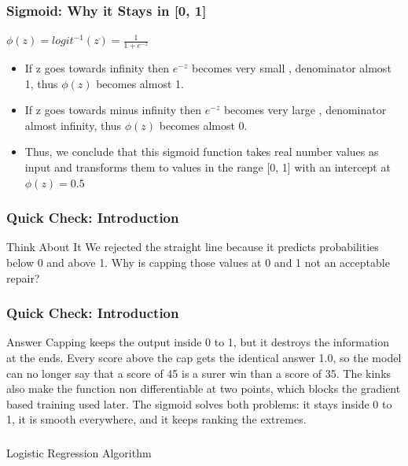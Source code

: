 \begin{frame}[fragile]\frametitle{Sigmoid: Why it Stays in [0, 1]}
$\phi(z) = logit^{-1}(z) = \frac{1}{1+ e^{-z}}$
 \begin{itemize}
\item If z goes towards infinity then $e^{-z}$ becomes very small , denominator almost 1, thus $\phi(z)$ becomes almost 1. 
\item If z goes towards minus infinity then $e^{-z}$ becomes very large , denominator almost infinity, thus $\phi(z)$ becomes almost 0. 
\item Thus, we conclude that this sigmoid function takes real number values as input and transforms them to values in 
the range [0, 1] with an intercept at  $\phi (z) = 0.5$
\end{itemize}
\end{frame}


\begin{frame}[fragile]\frametitle{Quick Check: Introduction}
\begin{block}{Think About It}
We rejected the straight line because it predicts probabilities below 0 and above 1. Why is capping those values at 0 and 1 not an acceptable repair?
\end{block}
\end{frame}

\begin{frame}[fragile]\frametitle{Quick Check: Introduction}
\begin{block}{Answer}
Capping keeps the output inside 0 to 1, but it destroys the information at the ends. Every score above the cap gets the identical answer 1.0, so the model can no longer say that a score of 45 is a surer win than a score of 35. The kinks also make the function non differentiable at two points, which blocks the gradient based training used later. The sigmoid solves both problems: it stays inside 0 to 1, it is smooth everywhere, and it keeps ranking the extremes.
\end{block}
\end{frame}

\begin{frame}[fragile]\frametitle{}
\begin{center}
{\Large Logistic Regression Algorithm}
\end{center}
\end{frame}

